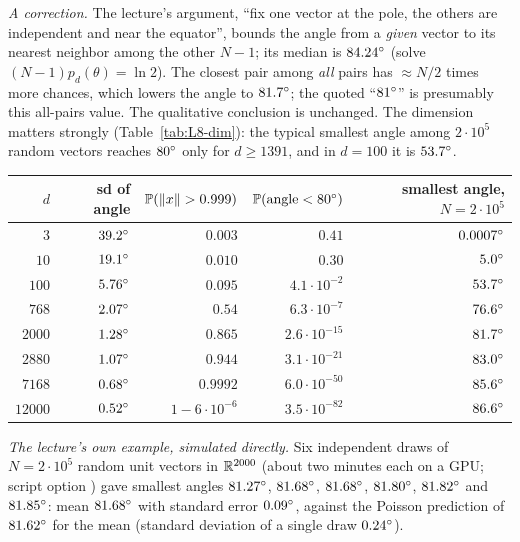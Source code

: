 \begin{beyond}
\emph{A correction.} The lecture's argument, ``fix one vector at the pole, the others are independent and near the equator'', bounds the angle from a \emph{given} vector to its nearest neighbor among the other $N-1$; its median is $84.24^{\circ}$ (solve $(N-1)p_d(\theta)=\ln2$). The closest pair among \emph{all} pairs has $\approx N/2$ times more chances, which lowers the angle to $81.7^{\circ}$; the quoted ``$81^{\circ}$'' is presumably this all-pairs value. The qualitative conclusion is unchanged. The dimension matters strongly (Table~\ref{tab:L8-dim}): the typical smallest angle among $2\cdot10^5$ random vectors reaches $80^{\circ}$ only for $d\ge1391$, and in $d=100$ it is $53.7^{\circ}$.
\begin{center}\small
\renewcommand{\arraystretch}{1.12}
\begin{tabular}{@{}rrrrr@{}}
\toprule
$d$ & sd of angle & $\mathbb{P}(\left\lVert x\right\rVert>0.999)$ & $\mathbb{P}(\text{angle}<80^{\circ})$ & smallest angle, $N=2\cdot10^5$\\
\midrule
$3$ & $39.2^{\circ}$ & $0.003$ & $0.41$ & $0.0007^{\circ}$\\
$10$ & $19.1^{\circ}$ & $0.010$ & $0.30$ & $5.0^{\circ}$\\
$100$ & $5.76^{\circ}$ & $0.095$ & $4.1\cdot10^{-2}$ & $53.7^{\circ}$\\
$768$ & $2.07^{\circ}$ & $0.54$ & $6.3\cdot10^{-7}$ & $76.6^{\circ}$\\
$2000$ & $1.28^{\circ}$ & $0.865$ & $2.6\cdot10^{-15}$ & $81.7^{\circ}$\\
$2880$ & $1.07^{\circ}$ & $0.944$ & $3.1\cdot10^{-21}$ & $83.0^{\circ}$\\
$7168$ & $0.68^{\circ}$ & $0.9992$ & $6.0\cdot10^{-50}$ & $85.6^{\circ}$\\
$12000$ & $0.52^{\circ}$ & $1-6\cdot10^{-6}$ & $3.5\cdot10^{-82}$ & $86.6^{\circ}$\\
\bottomrule
\end{tabular}
\label{tab:L8-dim}
\end{center}
\emph{The lecture's own example, simulated directly.} Six independent draws of $N=2\cdot10^5$ random unit vectors in $\mathbb{R}^{2000}$ (about two minutes each on a GPU; script option ) gave smallest angles $81.27^{\circ}$, $81.68^{\circ}$, $81.68^{\circ}$, $81.80^{\circ}$, $81.82^{\circ}$ and $81.85^{\circ}$: mean $81.68^{\circ}$ with standard error $0.09^{\circ}$, against the Poisson prediction of $81.62^{\circ}$ for the mean (standard deviation of a single draw $0.24^{\circ}$).
\end{beyond}

